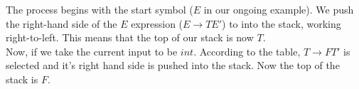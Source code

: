 The process begins with the start symbol ($E$ in our ongoing example). We push the right-hand side of the $E$ expression ($E \rightarrow TE'$) to into the stack, working right-to-left. This means that the top of our stack is now $T$.\\

Now, if we take the current input to be $int$. According to the table, $T \rightarrow FT'$ is selected and it's right hand side is pushed into the stack. Now the top of the stack is $F$.

